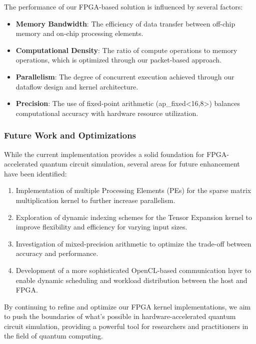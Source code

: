 \documentclass[12pt,oneside,a4paper]{article}
\begin{document}
The performance of our FPGA-based solution is influenced by several factors:

\begin{itemize}
    \item \textbf{Memory Bandwidth}: The efficiency of data transfer between off-chip memory and on-chip processing elements.
    \item \textbf{Computational Density}: The ratio of compute operations to memory operations, which is optimized through our packet-based approach.
    \item \textbf{Parallelism}: The degree of concurrent execution achieved through our dataflow design and kernel architecture.
    \item \textbf{Precision}: The use of fixed-point arithmetic (ap_fixed<16,8>) balances computational accuracy with hardware resource utilization.
\end{itemize}

\subsubsection{Future Work and Optimizations}

While the current implementation provides a solid foundation for FPGA-accelerated quantum circuit simulation, several areas for future enhancement have been identified:

\begin{enumerate}
    \item Implementation of multiple Processing Elements (PEs) for the sparse matrix multiplication kernel to further increase parallelism.
    \item Exploration of dynamic indexing schemes for the Tensor Expansion kernel to improve flexibility and efficiency for varying input sizes.
    \item Investigation of mixed-precision arithmetic to optimize the trade-off between accuracy and performance.
    \item Development of a more sophisticated OpenCL-based communication layer to enable dynamic scheduling and workload distribution between the host and FPGA.
\end{enumerate}

By continuing to refine and optimize our FPGA kernel implementations, we aim to push the boundaries of what's possible in hardware-accelerated quantum circuit simulation, providing a powerful tool for researchers and practitioners in the field of quantum computing.
\end{document}
